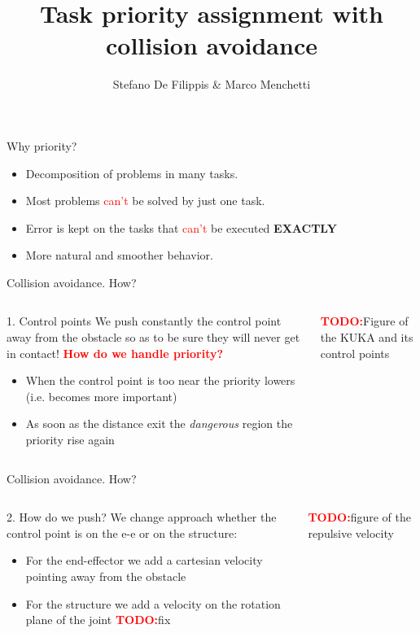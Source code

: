 \documentclass[11pt]{beamer}
\author[Stefano, Marco]{Stefano De Filippis \& Marco Menchetti}
\title[ROB2 project]{Task priority assignment with collision avoidance}
\institute[Sapienza]{Sapienza - University of Rome}
\date{}
\newcommand{\todo}{\textcolor{red}{\textbf{TODO:}}}
\begin{document}
\begin{frame}
\titlepage
\end{frame}


\begin{frame}{Why priority?}
\begin{itemize}
\item Decomposition of problems in many tasks.
\item Most problems \textcolor{red}{can't} be solved by just one task.
\item Error is kept on the tasks that \textcolor{red}{can't} be executed	\textbf{EXACTLY} 
\item More natural and smoother behavior.
\end{itemize}
\end{frame}

\begin{frame}{Collision avoidance. How?}
\begin{columns}
\begin{column}{.5\textwidth}
\begin{block}{1. Control points}
We push constantly the control point away from the obstacle so as to be sure they will never get in contact!
\textbf{\textcolor{red}{How do we handle priority?}}
\begin{itemize}
\item When the control point is too near the priority lowers (i.e. becomes more important)
\item As soon as the distance exit the \emph{dangerous} region the priority rise again
\end{itemize}
\end{block}
\end{column}
\begin{column}{.5\textwidth}
\todo Figure of the KUKA and its control points
\end{column}
\end{columns}
\end{frame}

\begin{frame}{Collision avoidance. How?}
\begin{columns}
\begin{column}{.5\textwidth}
\begin{block}{2. How do we push?}
We change approach whether the control point is on the e-e or on the structure:
\begin{itemize}
\item For the end-effector we add a cartesian velocity pointing away from the obstacle
\item For the structure we add a velocity on the rotation plane of the joint \todo fix
\end{itemize}
\end{block}
\end{column}
\begin{column}{.5\textwidth}
\todo figure of the repulsive velocity
\end{column}
\end{columns}
\end{frame}
\end{document}
